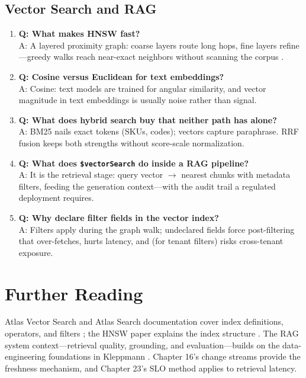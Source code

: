\subsection{Vector Search and RAG}
\begin{enumerate}
    \item \textbf{Q: What makes HNSW fast?}\\
    A: A layered proximity graph: coarse layers route long hops, fine layers refine---greedy walks reach near-exact neighbors without scanning the corpus \cite{malkov2020hnsw}.

    \item \textbf{Q: Cosine versus Euclidean for text embeddings?}\\
    A: Cosine: text models are trained for angular similarity, and vector magnitude in text embeddings is usually noise rather than signal.

    \item \textbf{Q: What does hybrid search buy that neither path has alone?}\\
    A: BM25 nails exact tokens (SKUs, codes); vectors capture paraphrase. RRF fusion keeps both strengths without score-scale normalization.

    \item \textbf{Q: What does \texttt{\$vectorSearch} do inside a RAG pipeline?}\\
    A: It is the retrieval stage: query vector $\to$ nearest chunks with metadata filters, feeding the generation context---with the audit trail a regulated deployment requires.

    \item \textbf{Q: Why declare filter fields in the vector index?}\\
    A: Filters apply during the graph walk; undeclared fields force post-filtering that over-fetches, hurts latency, and (for tenant filters) risks cross-tenant exposure.
\end{enumerate}

\section{Further Reading}
Atlas Vector Search and Atlas Search documentation cover index definitions, operators, and filters \cite{mongodbAtlasVectorSearch,mongodbAtlasSearchDocs}; the HNSW paper explains the index structure \cite{malkov2020hnsw}. The RAG system context---retrieval quality, grounding, and evaluation---builds on the data-engineering foundations in Kleppmann \cite{kleppmann2017ddia}. Chapter 16's change streams provide the freshness mechanism, and Chapter 23's SLO method applies to retrieval latency.

